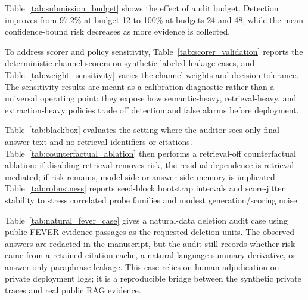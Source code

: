 

Table~\ref{tab:submission_budget} shows the effect of audit budget. Detection improves from 97.2\% at budget 12 to 100\% at budgets 24 and 48, while the mean confidence-bound risk decreases as more evidence is collected.

To address scorer and policy sensitivity, Table~\ref{tab:scorer_validation} reports the deterministic channel scorers on synthetic labeled leakage cases, and Table~\ref{tab:weight_sensitivity} varies the channel weights and decision tolerance. The sensitivity results are meant as a calibration diagnostic rather than a universal operating point: they expose how semantic-heavy, retrieval-heavy, and extraction-heavy policies trade off detection and false alarms before deployment.





Table~\ref{tab:blackbox} evaluates the setting where the auditor sees only final answer text and no retrieval identifiers or citations. Table~\ref{tab:counterfactual_ablation} then performs a retrieval-off counterfactual ablation: if disabling retrieval removes risk, the residual dependence is retrieval-mediated; if risk remains, model-side or answer-side memory is implicated. Table~\ref{tab:robustness} reports seed-block bootstrap intervals and score-jitter stability to stress correlated probe families and modest generation/scoring noise.







Table~\ref{tab:natural_fever_case} gives a natural-data deletion audit case using public FEVER evidence passages as the requested deletion units. The observed answers are redacted in the manuscript, but the audit still records whether risk came from a retained citation cache, a natural-language summary derivative, or answer-only paraphrase leakage. This case relies on human adjudication on private deployment logs; it is a reproducible bridge between the synthetic private traces and real public RAG evidence.

